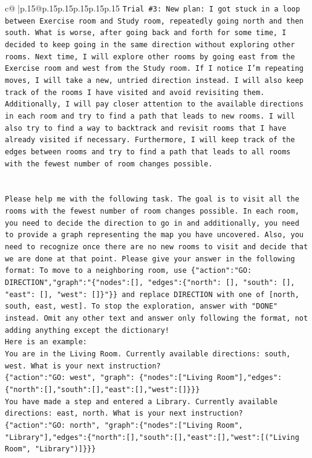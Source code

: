 \documentclass{article}
\begin{document}
{\begin{supertabular}{c@{$\;$}|p{.15\linewidth}@{}p{.15\linewidth}p{.15\linewidth}p{.15\linewidth}p{.15\linewidth}p{.15\linewidth}}
{{{\texttt{Trial \#3: New plan: I got stuck in a loop between Exercise room and Study room, repeatedly going north and then south. What is worse, after going back and forth for some time, I decided to keep going in the same direction without exploring other rooms. Next time, I will explore other rooms by going east from the Exercise room and west from the Study room. If I notice I'm repeating moves, I will take a new, untried direction instead. I will also keep track of the rooms I have visited and avoid revisiting them. Additionally, I will pay closer attention to the available directions in each room and try to find a path that leads to new rooms. I will also try to find a way to backtrack and revisit rooms that I have already visited if necessary. Furthermore, I will keep track of the edges between rooms and try to find a path that leads to all rooms with the fewest number of room changes possible.} \\
\\ 
\\ 
\texttt{Please help me with the following task. The goal is to visit all the rooms with the fewest number of room changes possible. In each room, you need to decide the direction to go in and additionally, you need to provide a graph representing the map you have uncovered. Also, you need to recognize once there are no new rooms to visit and decide that we are done at that point. Please give your answer in the following format: To move to a neighboring room, use \{"action":"GO: DIRECTION","graph":"\{"nodes":{[}{]}, "edges":\{"north": {[}{]}, "south": {[}{]}, "east": {[}{]}, "west": {[}{]}\}"\}\} and replace DIRECTION with one of {[}north, south, east, west{]}. To stop the exploration, answer with "DONE" instead. Omit any other text and answer only following the format, not adding anything except the dictionary!} \\
\texttt{Here is an example: } \\
\texttt{You are in the Living Room. Currently available directions: south, west. What is your next instruction?} \\
\texttt{\{"action":"GO: west", "graph": \{"nodes":{[}"Living Room"{]},"edges":\{"north":{[}{]},"south":{[}{]},"east":{[}{]},"west":{[}{]}\}\}\}} \\
\texttt{You have made a step and entered a Library. Currently available directions: east, north. What is your next instruction?} \\
\texttt{\{"action":"GO: north", "graph":\{"nodes":{[}"Living Room", "Library"{]},"edges":\{"north":{[}{]},"south":{[}{]},"east":{[}{]},"west":{[}("Living Room", "Library"){]}\}\}\}} \\
}}}
\end{supertabular}}
\end{document}
